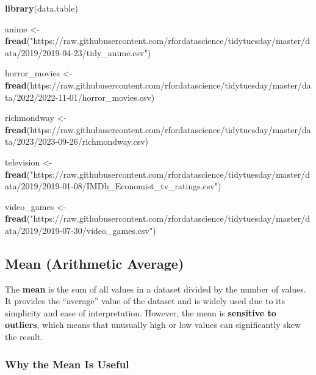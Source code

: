 \documentclass[
]{book}
\newenvironment{Shaded}{\begin{snugshade}}{\end{snugshade}}
\newcommand{\FunctionTok}[1]{\textcolor[rgb]{0.13,0.29,0.53}{\textbf{#1}}}
\newcommand{\NormalTok}[1]{#1}
\newcommand{\OtherTok}[1]{\textcolor[rgb]{0.56,0.35,0.01}{#1}}
\newcommand{\StringTok}[1]{\textcolor[rgb]{0.31,0.60,0.02}{#1}}
\begin{document}
\begin{Shaded}
\begin{Highlighting}[]
\FunctionTok{library}\NormalTok{(data.table)}

\NormalTok{anime }\OtherTok{\textless{}{-}} \FunctionTok{fread}\NormalTok{(}\StringTok{"https://raw.githubusercontent.com/rfordatascience/tidytuesday/master/data/2019/2019{-}04{-}23/tidy\_anime.csv"}\NormalTok{)}

\NormalTok{horror\_movies }\OtherTok{\textless{}{-}} \FunctionTok{fread}\NormalTok{(}\StringTok{\textquotesingle{}https://raw.githubusercontent.com/rfordatascience/tidytuesday/master/data/2022/2022{-}11{-}01/horror\_movies.csv\textquotesingle{}}\NormalTok{)}

\NormalTok{richmondway }\OtherTok{\textless{}{-}} \FunctionTok{fread}\NormalTok{(}\StringTok{\textquotesingle{}https://raw.githubusercontent.com/rfordatascience/tidytuesday/master/data/2023/2023{-}09{-}26/richmondway.csv\textquotesingle{}}\NormalTok{)}

\NormalTok{television }\OtherTok{\textless{}{-}} \FunctionTok{fread}\NormalTok{(}\StringTok{"https://raw.githubusercontent.com/rfordatascience/tidytuesday/master/data/2019/2019{-}01{-}08/IMDb\_Economist\_tv\_ratings.csv"}\NormalTok{)}

\NormalTok{video\_games }\OtherTok{\textless{}{-}} \FunctionTok{fread}\NormalTok{(}\StringTok{"https://raw.githubusercontent.com/rfordatascience/tidytuesday/master/data/2019/2019{-}07{-}30/video\_games.csv"}\NormalTok{)}
\end{Highlighting}
\end{Shaded}

\subsection*{Mean (Arithmetic Average)}\label{mean-arithmetic-average}

The \textbf{mean} is the sum of all values in a dataset divided by the number of values. It provides the ``average'' value of the dataset and is widely used due to its simplicity and ease of interpretation. However, the mean is \textbf{sensitive to outliers}, which means that unusually high or low values can significantly skew the result.

\subsubsection*{Why the Mean Is Useful}\label{why-the-mean-is-useful}
\end{document}
